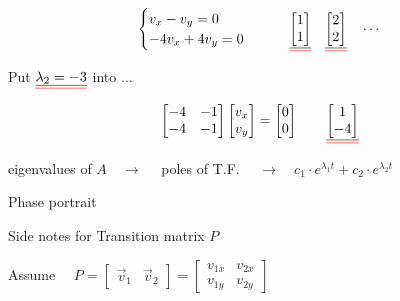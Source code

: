 \documentclass[
  letterpaper,
  DIV=11,
  numbers=noendperiod,
  oneside]{scrreprt}
\begin{document}
\[\begin{cases}v_x - v_y = 0 \\ -4v_x + 4v_y = 0 \end{cases} \qquad \color{red}\underline{\underline{\color{black}\begin{bmatrix}1\\1\end{bmatrix}}} \quad \color{red}\underline{\underline{\color{black}\begin{bmatrix}2\\2\end{bmatrix}}} \quad \color{black} \cdots\]

Put \(\color{red}\underline{\underline{\color{black}\lambda_2=-3}}\)
into \(\dots\)

\[ \begin{bmatrix}-4&-1\\-4&-1\end{bmatrix} \begin{bmatrix}v_x\\v_y\end{bmatrix} = \begin{bmatrix}0\\0\end{bmatrix} \qquad \color{red}\underline{\underline{\color{black}\begin{bmatrix}1\\-4\end{bmatrix}}}\]

eigenvalues of \(A\quad\longrightarrow\quad\) poles of T.F.
\(\quad\longrightarrow\quad c_1\cdot e^{\lambda_1 t} + c_2\cdot e^{\lambda_2 t}\)

Phase portrait

Side notes for Transition matrix \(P\)

Assume
\(\quad P = \begin{bmatrix}\vec{v}_1 & \vec{v}_2\end{bmatrix} = \begin{bmatrix}v_{1x} & v_{2x} \\ v_{1y} & v_{2y}\end{bmatrix}\)
\end{document}
